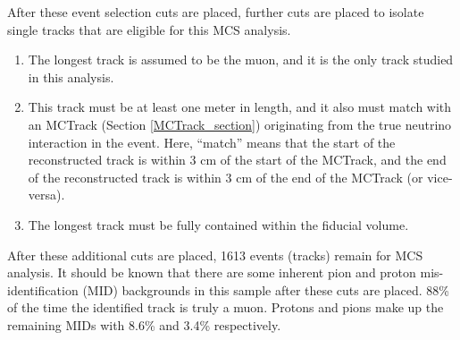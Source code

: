 After these event selection cuts are placed, further cuts are placed to isolate single tracks that are eligible for this MCS analysis. 
\begin{enumerate}
\item The longest track is assumed to be the muon, and it is the only track studied in this analysis. 
\item This track must be at least one meter in length, and it also must match with an {\sc MCTrack} (Section \ref{MCTrack_section}) originating from the true neutrino interaction in the event. Here, ``match'' means that the start of the reconstructed track is within 3 cm of the start of the {\sc MCTrack}, and the end of the reconstructed track is within 3 cm of the end of the {\sc MCTrack} (or vice-versa).
\item The longest track must be fully contained within the fiducial volume.
\end{enumerate}

After these additional cuts are placed, 1613 events (tracks) remain for MCS analysis. It should be known that there are some inherent pion and proton mis-identification (MID) backgrounds in this sample after these cuts are placed. 88\% of the time the identified track is truly a muon. Protons and pions make up the remaining MIDs with 8.6\% and 3.4\% respectively.





